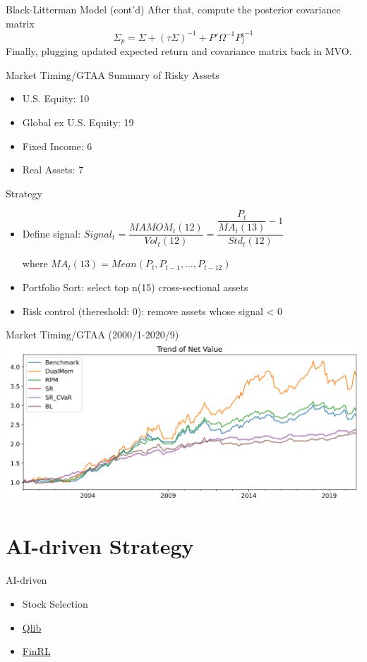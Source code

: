 \documentclass[aspectratio=169,11pt]{beamer}
\begin{document}
    \begin{frame}{Black-Litterman Model (cont’d)}
        After that, compute the posterior covariance matrix
        \[\Sigma_p=\Sigma+(\tau\Sigma)^{-1}+P'\Omega^{-1}P]^{-1}\]
        Finally, plugging updated expected return and covariance matrix back in MVO.
    \end{frame}

    \begin{frame}{Market Timing/GTAA}
        Summary of Risky Assets
        \begin{itemize}
            \item U.S. Equity: 10
            \item Global ex U.S. Equity: 19
            \item Fixed Income: 6
            \item Real Assets: 7
        \end{itemize}
        Strategy
        \begin{itemize}
            \item Define signal: \(Signal_t=\dfrac{MAMOM_t(12)}{Vol_t(12)}=\dfrac{\dfrac{P_t}{MA_t(13)}-1}{Std_t(12)}\)
            
            where \(MA_t(13)=Mean(P_t,P_{t-1},\dots,P_{t-12})\)
            \item Portfolio Sort: select top n(15) cross-sectional assets
            \item Risk control (thereshold: 0): remove assets whose signal < 0
        \end{itemize}
    \end{frame}

    \begin{frame}{Market Timing/GTAA (2000/1-2020/9)}
        \includegraphics[width=\linewidth]{gtaa_30bps.png}
    \end{frame}

    \section{AI-driven Strategy}
    \begin{frame}{AI-driven}
        \begin{itemize}
            \item Stock Selection
            \item \href{https://github.com/microsoft/qlib}{Qlib}
            \item \href{https://github.com/AI4Finance-LLC/FinRL-Library}{FinRL}
        \end{itemize}
    \end{frame}
\end{document}
